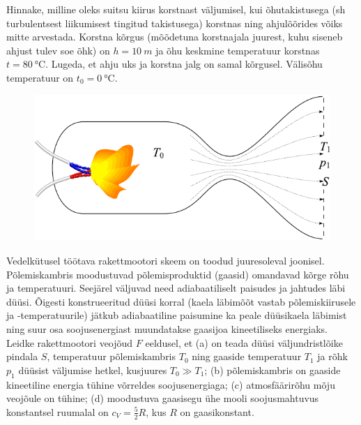 \documentclass[10pt, twoside]{article}
\begin{document}
{%

Hinnake, milline oleks suitsu kiirus korstnast väljumisel, kui õhutakistusega (sh turbulentsest liikumisest tingitud takistusega) korstnas ning ahjulõõrides võiks mitte arvestada.
Korstna kõrgus (mõõdetuna korstnajala juurest, kuhu siseneb ahjust tulev soe õhk) on $h=\SI{10}{m}$ ja õhu keskmine temperatuur korstnas $t=\SI{80}{\degreeCelsius}$. Lugeda, et ahju uks ja korstna jalg on samal kõrgusel. Välisõhu temperatuur on $t_0=\SI{0}{\degreeCelsius}$.
\probend
\bigskip


\begin{figure}
	\vspace{-3ex}
	\includegraphics[width=\linewidth]{2010-lahg-10-rakettmootor}
	\vspace{-6ex}
\end{figure}
Vedelkütusel töötava rakettmootori skeem on toodud juuresoleval joonisel. Põlemiskambris moodustuvad põlemisproduktid (gaasid) omandavad kõrge rõhu ja temperatuuri. Seejärel väljuvad need adiabaatiliselt paisudes ja jahtudes läbi düüsi. Õigesti konstrueeritud düüsi korral (kaela läbimõõt vastab põlemiskiirusele ja -temperatuurile) jätkub adiabaatiline paisumine ka peale düüsikaela läbimist ning suur osa soojusenergiast muundatakse gaasijoa kineetiliseks energiaks. Leidke rakettmootori veojõud $F$ eeldusel, et (a) on teada düüsi väljundristlõike pindala $S$, temperatuur põlemiskambris $T_0$ ning gaaside temperatuur $T_1$ ja rõhk $p_1$ düüsist väljumise hetkel, kusjuures $T_0 \gg T_1$; (b) põlemiskambris on gaaside kineetiline energia tühine võrreldes soojusenergiaga; (c) atmosfäärirõhu mõju veojõule on tühine; (d) moodustuva gaasisegu ühe mooli soojusmahtuvus konstantsel ruumalal on $c_V = \frac52 R$, kus $R$ on gaasikonstant.
\probend
\bigskip
\newpage\subsection{\protect{}}

}
\end{document}
